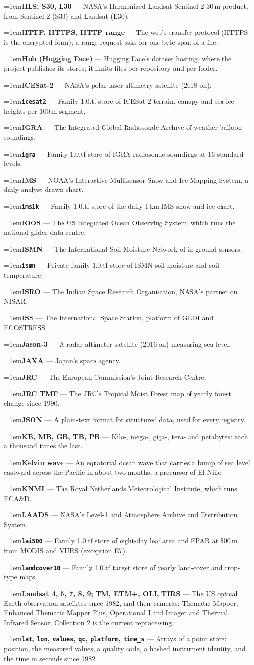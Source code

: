 \documentclass[10pt]{article}
\newcommand{\code}[1]{\texttt{#1}}
\newcommand{\gl}[2]{\par\hangindent=1em\hangafter=1\textbf{#1} --- #2\par}
\begin{document}
\gl{HLS; S30, L30}{NASA's Harmonized Landsat Sentinel-2 30\,m product, from Sentinel-2 (S30) and Landsat (L30).}
\gl{HTTP, HTTPS, HTTP range}{The web's transfer protocol (HTTPS is the encrypted form); a range request asks for one byte span of a file.}
\gl{Hub (Hugging Face)}{Hugging Face's dataset hosting, where the project publishes its stores; it limits files per repository and per folder.}
\gl{ICESat-2}{NASA's polar laser-altimetry satellite (2018 on).}
\gl{\code{icesat2}}{Family 1.0.tf store of ICESat-2 terrain, canopy and sea-ice heights per 100\,m segment.}
\gl{IGRA}{The Integrated Global Radiosonde Archive of weather-balloon soundings.}
\gl{\code{igra}}{Family 1.0.tf store of IGRA radiosonde soundings at 16 standard levels.}
\gl{IMS}{NOAA's Interactive Multisensor Snow and Ice Mapping System, a daily analyst-drawn chart.}
\gl{\code{ims1k}}{Family 1.0.tf store of the daily 1\,km IMS snow and ice chart.}
\gl{IOOS}{The US Integrated Ocean Observing System, which runs the national glider data centre.}
\gl{ISMN}{The International Soil Moisture Network of in-ground sensors.}
\gl{\code{ismn}}{Private family 1.0.tf store of ISMN soil moisture and soil temperature.}
\gl{ISRO}{The Indian Space Research Organisation, NASA's partner on NISAR.}
\gl{ISS}{The International Space Station, platform of GEDI and ECOSTRESS.}
\gl{Jason-3}{A radar altimeter satellite (2016 on) measuring sea level.}
\gl{JAXA}{Japan's space agency.}
\gl{JRC}{The European Commission's Joint Research Centre.}
\gl{JRC TMF}{The JRC's Tropical Moist Forest map of yearly forest change since 1990.}
\gl{JSON}{A plain-text format for structured data, used for every registry.}
\gl{KB, MB, GB, TB, PB}{Kilo-, mega-, giga-, tera- and petabytes: each a thousand times the last.}
\gl{Kelvin wave}{An equatorial ocean wave that carries a bump of sea level eastward across the Pacific in about two months, a precursor of El Ni\~no.}
\gl{KNMI}{The Royal Netherlands Meteorological Institute, which runs ECA\&D.}
\gl{LAADS}{NASA's Level-1 and Atmosphere Archive and Distribution System.}
\gl{\code{lai500}}{Family 1.0.tf store of eight-day leaf area and FPAR at 500\,m from MODIS and VIIRS (exception E7).}
\gl{\code{landcover10}}{Family 1.0.tf target store of yearly land-cover and crop-type maps.}
\gl{Landsat 4, 5, 7, 8, 9; TM, ETM+, OLI, TIRS}{The US optical Earth-observation satellites since 1982, and their cameras: Thematic Mapper, Enhanced Thematic Mapper Plus, Operational Land Imager and Thermal Infrared Sensor; Collection 2 is the current reprocessing.}
\gl{\code{lat}, \code{lon}, \code{values}, \code{qc}, \code{platform}, \code{time\_s}}{Arrays of a point store: position, the measured values, a quality code, a hashed instrument identity, and the time in seconds since 1982.}
\end{document}
